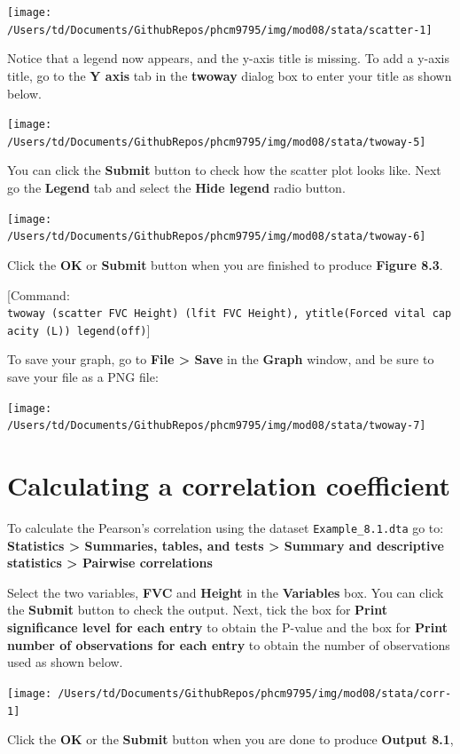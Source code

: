 \documentclass[
]{memoir}
\begin{document}
\texttt{[image: /Users/td/Documents/GithubRepos/phcm9795/img/mod08/stata/scatter-1]}

Notice that a legend now appears, and the y-axis title is missing. To add a y-axis title, go to the \textbf{Y axis} tab in the \textbf{twoway} dialog box to enter your title as shown below.

\texttt{[image: /Users/td/Documents/GithubRepos/phcm9795/img/mod08/stata/twoway-5]}

You can click the \textbf{Submit} button to check how the scatter plot looks like. Next go the \textbf{Legend} tab and select the \textbf{Hide legend} radio button.

\texttt{[image: /Users/td/Documents/GithubRepos/phcm9795/img/mod08/stata/twoway-6]}

Click the \textbf{OK} or \textbf{Submit} button when you are finished to produce \textbf{Figure 8.3}.

{[}Command: \texttt{twoway\ (scatter\ FVC\ Height)\ (lfit\ FVC\ Height),\ ytitle(Forced\ vital\ capacity\ (L))\ legend(off)}{]}

To save your graph, go to \textbf{File \textgreater{} Save} in the \textbf{Graph} window, and be sure to save your file as a PNG file:

\texttt{[image: /Users/td/Documents/GithubRepos/phcm9795/img/mod08/stata/twoway-7]}

\hypertarget{calculating-a-correlation-coefficient}{%
\section{Calculating a correlation coefficient}\label{calculating-a-correlation-coefficient}}

To calculate the Pearson's correlation using the dataset \texttt{Example\_8.1.dta} go to: \textbf{Statistics \textgreater{} Summaries, tables, and tests \textgreater{} Summary and descriptive statistics \textgreater{} Pairwise correlations}

Select the two variables, \textbf{FVC} and \textbf{Height} in the \textbf{Variables} box. You can click the \textbf{Submit} button to check the output. Next, tick the box for \textbf{Print significance level for each entry} to obtain the P-value and the box for \textbf{Print number of observations for each entry} to obtain the number of observations used as shown below.

\texttt{[image: /Users/td/Documents/GithubRepos/phcm9795/img/mod08/stata/corr-1]}

Click the \textbf{OK} or the \textbf{Submit} button when you are done to produce \textbf{Output 8.1},
\end{document}
